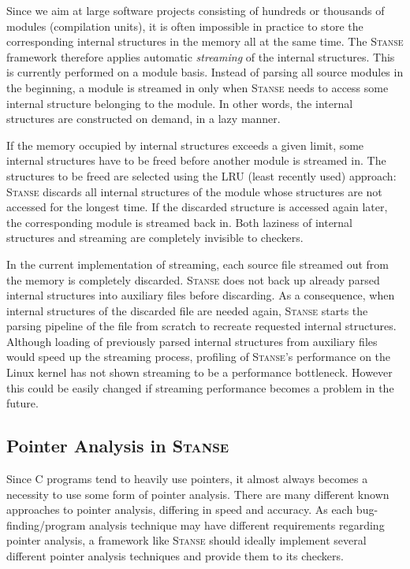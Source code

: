 \documentclass{llncs}
\newcommand{\Stanse}{\textsc{Stanse}\xspace}
\begin{document}
Since we aim at large software projects consisting of hundreds or thousands of
modules (compilation units), it is often impossible in practice to store the
corresponding internal structures in the memory all at the same time. The \Stanse
framework therefore applies automatic \emph{streaming} of the internal
structures. This is currently performed on a module basis. Instead of parsing
all source modules in the beginning, a module is streamed in only when \Stanse
needs to access some internal structure belonging to the module. In other
words, the internal structures are constructed on demand, in a lazy manner.

If the memory occupied by internal structures exceeds a given limit, some
internal structures have to be freed before another module is streamed
in. The structures to be freed are selected using the LRU (least recently used)
approach: \Stanse discards all internal structures of the module whose
structures are not accessed for the longest time. If the discarded structure
is accessed again later, the corresponding module is streamed back in. Both
laziness of internal structures and streaming are completely invisible to
checkers. 

In the current implementation of streaming, each source file streamed out
from the memory is completely discarded. \Stanse does not back up already
parsed internal structures into auxiliary files before discarding. As a
consequence, when internal structures of the discarded file are needed again,
\Stanse starts the parsing pipeline of the file from scratch to recreate
requested internal structures. Although loading of previously parsed internal
structures from auxiliary files would speed up the streaming process,
profiling of \Stanse's performance on the Linux kernel has not shown
streaming to be a performance bottleneck. However this could be easily
changed if streaming performance becomes a problem in the future.


\subsection{Pointer Analysis in \Stanse}

Since C programs tend to heavily use pointers, it almost always becomes a
necessity to use some form of pointer analysis. There are many different
known approaches to pointer analysis, differing in speed and accuracy. As
each bug-finding/program analysis technique may have different requirements
regarding pointer analysis, a framework like \Stanse
should ideally implement several different pointer analysis techniques and
provide them to its checkers.
\end{document}
